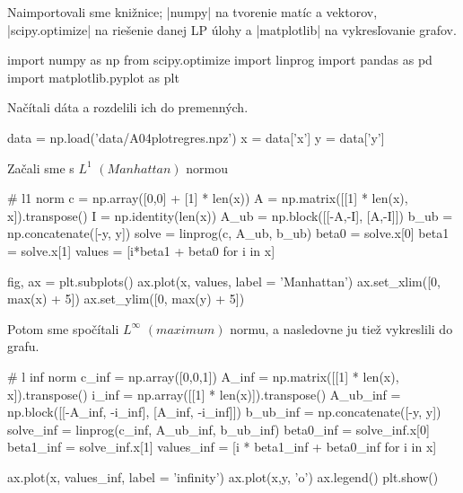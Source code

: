 \documentclass[12pt,oneside,a4paper,slovak]{article}
\begin{document}
Naimportovali sme knižnice; \pyth|numpy| na tvorenie matíc a vektorov, \pyth|scipy.optimize| na riešenie danej LP úlohy a \pyth|matplotlib| na vykresľovanie grafov.
\begin{python}
import numpy as np
from scipy.optimize import linprog
import pandas as pd
import matplotlib.pyplot as plt
\end{python}
Načítali dáta a rozdelili ich do premenných.
\begin{python}
data = np.load('data/A04plotregres.npz')
x = data['x']
y = data['y']
\end{python}
Začali sme s $L^1$ $(Manhattan)$ normou
\begin{python}
# l1 norm
c = np.array([0,0] + [1] * len(x))
A = np.matrix([[1] * len(x), x]).transpose()
I = np.identity(len(x))
A_ub = np.block([[-A,-I], [A,-I]])
b_ub = np.concatenate([-y, y])
solve = linprog(c, A_ub, b_ub)
beta0 = solve.x[0]
beta1 = solve.x[1]
values = [i*beta1 + beta0 for i in x]
\end{python}
\begin{python}
fig, ax = plt.subplots()
ax.plot(x, values, label = 'Manhattan')
ax.set_xlim([0, max(x) + 5])
ax.set_ylim([0, max(y) + 5]) 
\end{python}
Potom sme spočítali $L^\infty$ $(maximum)$ normu, a nasledovne ju tiež vykreslili do grafu.
\begin{python}
# l inf norm
c_inf = np.array([0,0,1])
A_inf = np.matrix([[1] * len(x), x]).transpose()
i_inf = np.array([[1] * len(x)]).transpose()
A_ub_inf = np.block([[-A_inf, -i_inf], [A_inf, -i_inf]])
b_ub_inf = np.concatenate([-y, y])
solve_inf = linprog(c_inf, A_ub_inf, b_ub_inf)
beta0_inf = solve_inf.x[0]
beta1_inf = solve_inf.x[1]
values_inf = [i * beta1_inf + beta0_inf for i in x]
\end{python}
\begin{python}
ax.plot(x, values_inf, label = 'infinity')
ax.plot(x,y, 'o')
ax.legend()
plt.show()
\end{python}
\end{document}
